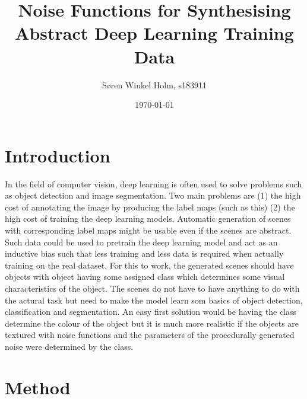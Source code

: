 \documentclass[12pt,fleqn]{article}
\title{Noise Functions for Synthesising Abstract Deep Learning Training Data}
\author{Søren Winkel Holm, s183911}
\date{\today}
\begin{document}
\maketitle
\thispagestyle{fancy}
\tableofcontents
\newpage

\section{Introduction}%
\label{sec:intro}
In the field of computer vision, deep learning is often used to solve problems such as object detection and image segmentation. Two main problems are (1) the high cost of annotating the image by producing the label maps (such as this) (2) the high cost of training the deep learning models. Automatic generation of scenes with corresponding label maps might be usable even if the scenes are abstract. Such data could be used to pretrain the deep learning model and act as an inductive bias such that less training and less data is required when actually training on the real dataset. For this to work, the generated scenes should have objects with object having some assigned class which determines some visual characteristics of the object. The scenes do not have to have anything to do with the actural task but need to make the model learn som basics of object detection, classification and segmentation. An easy first solution would be having the class determine the colour of the object but it is much more realistic if the objects are textured with noise functions and the parameters of the procedurally generated noise were determined by the class.

\section{Method}%
\label{sec:method}
\end{document}

